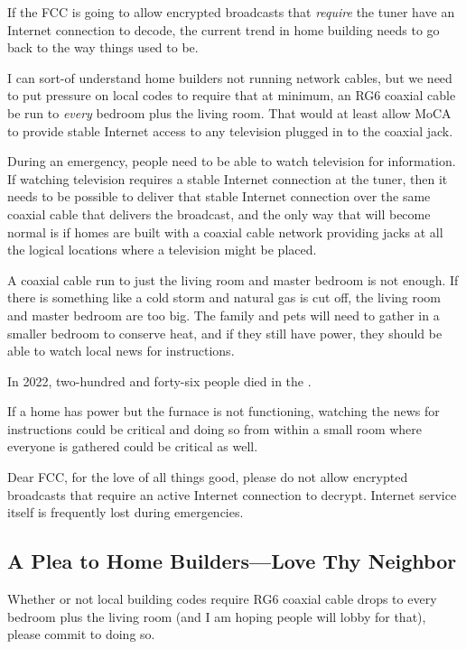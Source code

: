 If the FCC is going to allow encrypted  broadcasts that \emph{require} the  tuner have an
Internet connection to decode, the current trend in home building needs to go back to the way things used to
be.

I can sort-of understand home builders not running network cables, but we need to put pressure on local codes
to require that at minimum, an RG6 coaxial cable be run to \emph{every} bedroom plus the living room. That
would at least allow MoCA to provide stable Internet access to any television plugged in to the coaxial jack.

During an emergency, people need to be able to watch television for information. If watching television requires
a stable Internet connection at the tuner, then it needs to be possible to deliver that stable Internet connection
over the same coaxial cable that delivers the broadcast, and the only way that will become normal is if homes
are built with a coaxial cable network providing jacks at all the logical locations where a television might
be placed.

A coaxial cable run to just the living room and master bedroom is not enough. If there is something like a cold
storm and natural gas is cut off, the living room and master bedroom are too big. The family and pets will need
to gather in a smaller bedroom to conserve heat, and if they still have power, they should be able to watch
local news for instructions.

In 2022, two-hundred and forty-six people died in the
.

If a home has power but the furnace is not functioning, watching the news for instructions could be critical
and doing so from within a small room where everyone is gathered could be critical as well.

Dear FCC, for the love of all things good, please do not allow encrypted  broadcasts that require
an active Internet connection to decrypt. Internet service itself is frequently lost during emergencies.

\subsection{A Plea to Home Builders---Love Thy Neighbor}

Whether or not local building codes require RG6 coaxial cable drops to every bedroom plus the living room (and I
am hoping people will lobby for that), please commit to doing so.

